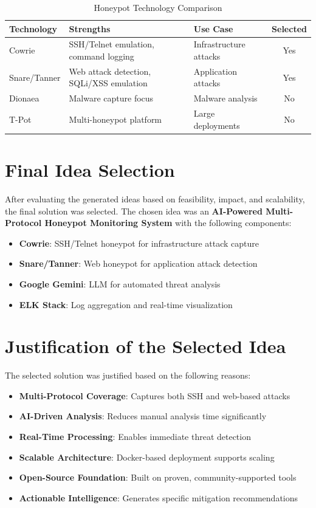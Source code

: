 \documentclass[12pt,a4paper]{report}
\begin{document}
\begin{table}[h]
\centering
\caption{Honeypot Technology Comparison}
\label{tab:honeypot_comparison}
\begin{tabular}{|l|p{4cm}|p{4cm}|c|}
\hline
\textbf{Technology} & \textbf{Strengths} & \textbf{Use Case} & \textbf{Selected} \\
\hline
Cowrie & SSH/Telnet emulation, command logging & Infrastructure attacks & Yes \\
\hline
Snare/Tanner & Web attack detection, SQLi/XSS emulation & Application attacks & Yes \\
\hline
Dionaea & Malware capture focus & Malware analysis & No \\
\hline
T-Pot & Multi-honeypot platform & Large deployments & No \\
\hline
\end{tabular}
\end{table}

\section{Final Idea Selection}

After evaluating the generated ideas based on feasibility, impact, and scalability, the final solution was selected. The chosen idea was an \textbf{AI-Powered Multi-Protocol Honeypot Monitoring System} with the following components:

\begin{itemize}
\item \textbf{Cowrie}: SSH/Telnet honeypot for infrastructure attack capture
\item \textbf{Snare/Tanner}: Web honeypot for application attack detection
\item \textbf{Google Gemini}: LLM for automated threat analysis
\item \textbf{ELK Stack}: Log aggregation and real-time visualization
\end{itemize}

\section{Justification of the Selected Idea}

The selected solution was justified based on the following reasons:

\begin{itemize}
\item \textbf{Multi-Protocol Coverage}: Captures both SSH and web-based attacks
\item \textbf{AI-Driven Analysis}: Reduces manual analysis time significantly
\item \textbf{Real-Time Processing}: Enables immediate threat detection
\item \textbf{Scalable Architecture}: Docker-based deployment supports scaling
\item \textbf{Open-Source Foundation}: Built on proven, community-supported tools
\item \textbf{Actionable Intelligence}: Generates specific mitigation recommendations
\end{itemize}
\end{document}
